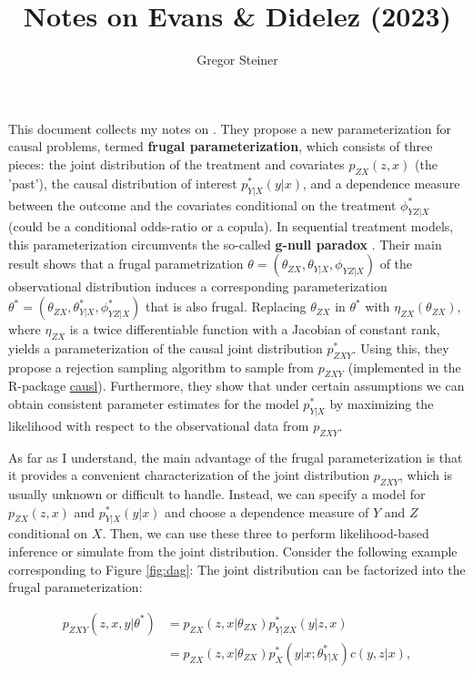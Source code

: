 \documentclass[10pt]{article}
\author{Gregor Steiner}
\title{Notes on Evans \& Didelez (2023)}
\begin{document}
\maketitle

This document collects my notes on \cite{evans_didelez_2023}. They propose a new parameterization for causal problems, termed \textbf{frugal parameterization}, which consists of three pieces: the joint distribution of the treatment and covariates $p_{ZX}(z, x)$ (the 'past'), the causal distribution of interest $p_{Y | X}^* (y|x)$, and a dependence measure between the outcome and the covariates conditional on the treatment $\phi_{YZ | X}^*$ (could be a conditional odds-ratio or a copula). In sequential treatment models, this parameterization circumvents the so-called \textbf{g-null paradox} \citep{robins_wasserman_1997}. Their main result shows that a frugal parametrization $\theta = (\theta_{ZX}, \theta_{Y|X}, \phi_{YZ | X})$ of the observational distribution induces a corresponding parameterization  $\theta^* = (\theta_{ZX}, \theta_{Y|X}^*, \phi_{YZ | X}^*)$ that is also frugal. Replacing $\theta_{ZX}$ in $\theta^*$ with $\eta_{ZX}(\theta_{ZX})$, where $\eta_{ZX}$ is a twice differentiable function with a Jacobian of constant rank, yields a parameterization of the causal joint distribution $p_{ZXY}^*$. Using this, they propose a rejection sampling algorithm to sample from $p_{ZXY}$ (implemented in the R-package \href{https://github.com/rje42/causl}{causl}). Furthermore, they show that under certain assumptions we can obtain consistent parameter estimates for the model $p_{Y | X}^*$ by maximizing the likelihood with respect to the observational data from $p_{ZXY}$. 

As far as I understand, the main advantage of the frugal parameterization is that it provides a convenient characterization of the joint distribution $p_{ZXY}$, which is usually unknown or difficult to handle. Instead, we can specify a model for $p_{ZX}(z, x)$ and $p_{Y | X}^* (y|x)$ and choose a dependence measure of $Y$ and $Z$ conditional on $X$. Then, we can use these three to perform likelihood-based inference or simulate from the joint distribution. Consider the following example corresponding to Figure \ref{fig:dag}: The joint distribution can be factorized into the frugal parameterization:

\begin{align}
	p_{ZXY}(z, x, y | \theta^*) &= p_{ZX}(z, x | \theta_{ZX}) p_{Y|ZX}^*(y|z, x) \\
	&= p_{ZX}(z, x | \theta_{ZX}) p_X^*(y | x; \theta_{Y|X}^*) c(y, z| x),
\end{align}
\end{document}

